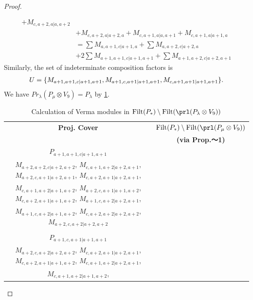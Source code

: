 \begin{proof}
\begin{enumerate}
\begin{enumerate}
\begin{equation}
\begin{aligned}
+ M_{c,a+2,a|a,a+2}\\
                                              &
+ M_{c,a+2,a|a+2,a}
+ M_{c,a+1,a|a,a+1}
+ M_{c,a+1,a|a+1,a} \\
                                               &=
\sum M_{a,a+1,c|a+1,a}
+ \sum M_{a,a+2,c|a+2,a}\\
                                              &
+ 2\sum M_{a+1,a+1,c|a+1,a+1}
+ \sum M_{a+1,a+2,c|a+2,a+1}
          \end{aligned}
        \end{equation}
      Similarly, the set of indeterminate composition factors is 
\begin{equation}\notag
  \begin{aligned}
    U = \{
M_{a+1,a+1,c|a+1,a+1},
M_{a+1,c,a+1|a+1,a+1},
M_{c,a+1,a+1|a+1,a+1}
\}. 
  \end{aligned}
\end{equation}
     We have $Pr_{\lambda}(P_\mu \otimes V_{9}) = P_\lambda  $ by \cref{tab:verma-analysis_d_8}.
\begin{table}[htbp]
\centering
\caption{Calculation of Verma modules in $\operatorname{Filt}(P_*) \setminus \operatorname{Filt}(\prl(P_\lambda \otimes V_{9})) $ } \label{tab:verma-analysis_d_8}
\begin{tabular}{cc}
\toprule
\textbf{Proj. Cover} & \textbf{$\operatorname{Filt}(P_*) \setminus \operatorname{Filt}(\prl(P_\mu \otimes V_{9})) $}  \\
     & \textbf{(via Prop.～1)}  \\
\midrule
 $P_{a+1,a+1,c|a+1,a+1}$ & \makecell{
 $M_{a+2,a+1,c|a+2,a+1}$,
 $M_{a+2,a+1,c|a+1,a+2}$,
 $M_{a+1,a+2,c|a+2,a+1}$,
 $M_{a+1,a+2,c|a+1,a+2}$, \\
 $M_{a+2,a+2,c|a+2,a+2}$,
 $M_{c,a+1,a+2|a+2,a+1}$,
 $M_{a+2,c,a+1|a+2,a+1}$,
 $M_{c,a+2,a+1|a+2,a+1}$, \\
 $M_{c,a+1,a+2|a+1,a+2}$,
 $M_{a+2,c,a+1|a+1,a+2}$,
 $M_{c,a+2,a+1|a+1,a+2}$,
 $M_{a+1,c,a+2|a+2,a+1}$, \\
 $M_{a+1,c,a+2|a+1,a+2}$,
 $M_{c,a+2,a+2|a+2,a+2}$,
 $M_{a+2,c,a+2|a+2,a+2}$
}\\
 & \\
 $P_{a+1,c,a+1|a+1,a+1}$ & \makecell{
 $M_{a+2,c,a+1|a+2,a+1}$,
 $M_{a+2,c,a+1|a+1,a+2}$,
 $M_{a+1,c,a+2|a+2,a+1}$,
 $M_{a+1,c,a+2|a+1,a+2}$, \\
 $M_{a+2,c,a+2|a+2,a+2}$,
 $M_{c,a+2,a+1|a+2,a+1}$,
 $M_{c,a+2,a+1|a+1,a+2}$,
 $M_{c,a+1,a+2|a+2,a+1}$, \\
 $M_{c,a+1,a+2|a+1,a+2}$,
}
\end{tabular}
\end{table}
\end{enumerate}
\end{enumerate}
\end{proof}
